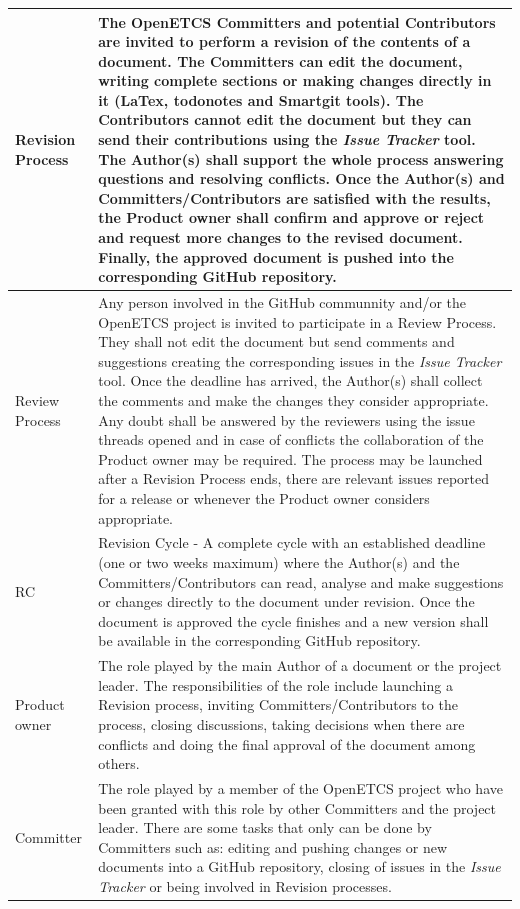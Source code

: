 \documentclass{template/openetcs_article}
\begin{document}
\begin{supertabular}{|m{3cm}m{11cm}|}
\hline
Revision Process &
The OpenETCS Committers and potential Contributors are invited to perform a revision of the contents of a document. The Committers can edit the document, writing complete sections or making changes directly in it (LaTex, todonotes and Smartgit tools). The Contributors cannot edit the document but they can send their contributions using the {\it Issue Tracker} tool. The Author(s) shall support the whole process answering questions and resolving conflicts. Once the Author(s) and Committers/Contributors are satisfied with the results, the Product owner shall confirm and approve or reject and request more changes to the revised document. Finally, the approved document is pushed into the corresponding GitHub repository.
\\\hline
Review Process &
Any person involved in the GitHub communnity and/or the OpenETCS project is invited to participate in a Review Process. They shall not edit the document but send comments and suggestions creating the corresponding issues in the {\it Issue Tracker} tool. Once the deadline has arrived, the Author(s) shall collect the comments and make the changes they consider appropriate. Any doubt shall be answered by the reviewers using the issue threads opened and in case of conflicts the collaboration of the Product owner may be required. The process may be launched after a Revision Process ends, there are relevant issues reported for a release or whenever the Product owner considers appropriate. 
\\\hline
RC &
Revision Cycle - A complete cycle with an established deadline (one or two weeks maximum) where the Author(s) and the Committers/Contributors can read, analyse and make suggestions or changes directly to the document under revision. Once the document is approved the cycle finishes and a new version shall be available in the corresponding GitHub repository.
\\\hline
Product owner &
The role played by the main Author of a document or the project leader. The responsibilities of the role include launching a Revision process, inviting Committers/Contributors to the process, closing discussions, taking decisions when there are conflicts and doing the final approval of the document among others.
\\\hline
Committer &
The role played by a member of the OpenETCS project who have been granted with this role by other Committers and the project leader. There are some tasks that only can be done by Committers such as: editing and pushing changes or new documents into a GitHub repository, closing of issues in the {\it Issue Tracker} or being involved in Revision processes.

\end{supertabular}
\end{document}
